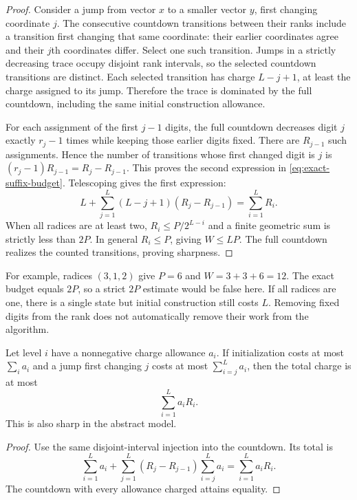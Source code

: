 \begin{proof}
Consider a jump from vector $x$ to a smaller vector $y$, first changing
coordinate $j$.  The consecutive countdown transitions between their ranks
include a transition first changing that same coordinate: their earlier
coordinates agree and their $j$th coordinates differ.  Select one such
transition.  Jumps in a strictly decreasing trace occupy disjoint rank
intervals, so the selected countdown transitions are distinct.  Each selected
transition has charge $L-j+1$, at least the charge assigned to its jump.
Therefore the trace is dominated by the full countdown, including the same
initial construction allowance.

For each assignment of the first $j-1$ digits, the full countdown decreases
digit $j$ exactly $r_j-1$ times while keeping those earlier digits fixed.
There are $R_{j-1}$ such assignments.  Hence the number of transitions whose
first changed digit is $j$ is
$(r_j-1)R_{j-1}=R_j-R_{j-1}$.  This proves the second expression in
\eqref{eq:exact-suffix-budget}.  Telescoping gives the first expression:
\[
 L+\sum_{j=1}^L(L-j+1)(R_j-R_{j-1})=\sum_{i=1}^L R_i.
\]
When all radices are at least two, $R_i\leq P/2^{L-i}$ and a finite
geometric sum is strictly less than $2P$.  In general $R_i\leq P$, giving
$W\leq LP$.  The full countdown realizes the counted transitions, proving
sharpness.
\end{proof}

For example, radices $(3,1,2)$ give $P=6$ and $W=3+3+6=12$.
The exact budget equals $2P$, so a strict $2P$ estimate would be false here.
If all radices are one, there is a single state but initial construction still
costs $L$.  Removing fixed digits from the rank does not automatically remove
their work from the algorithm.

\begin{corollary}
\label{cor:weighted-suffix}
Let level $i$ have a nonnegative charge allowance $a_i$.  If initialization
costs at most $\sum_i a_i$ and a jump first changing $j$ costs at most
$\sum_{i=j}^L a_i$, then the total charge is at most
\begin{equation}
 \sum_{i=1}^L a_iR_i.
 \label{eq:weighted-suffix}
\end{equation}
This is also sharp in the abstract model.
\end{corollary}

\begin{proof}
Use the same disjoint-interval injection into the countdown.  Its total is
\[
 \sum_{i=1}^L a_i+
 \sum_{j=1}^L(R_j-R_{j-1})\sum_{i=j}^L a_i
 =\sum_{i=1}^L a_iR_i.
\]
The countdown with every allowance charged attains equality.
\end{proof}

